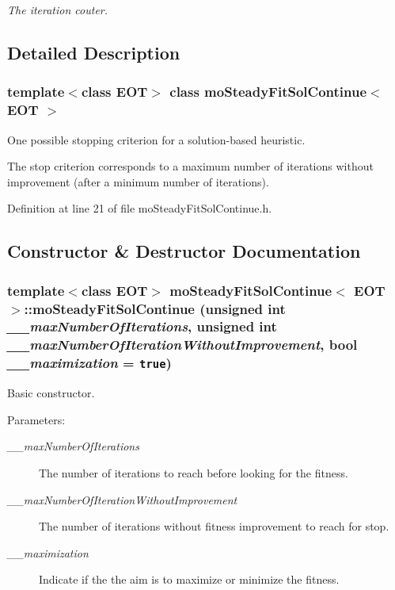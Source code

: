 \begin{CompactItemize}
\begin{CompactList}\small\item\em The iteration couter. \item\end{CompactList}\end{CompactItemize}


\subsection{Detailed Description}
\subsubsection*{template$<$class EOT$>$ class moSteadyFitSolContinue$<$ EOT $>$}

One possible stopping criterion for a solution-based heuristic. 

The stop criterion corresponds to a maximum number of iterations without improvement (after a minimum number of iterations). 



Definition at line 21 of file moSteadyFitSolContinue.h.

\subsection{Constructor \& Destructor Documentation}
\subsubsection{\setlength{\rightskip}{0pt plus 5cm}template$<$class EOT$>$ {\bf moSteadyFitSolContinue}$<$ EOT $>$::{\bf moSteadyFitSolContinue} (unsigned int {\em \_\-\_\-maxNumberOfIterations}, unsigned int {\em \_\-\_\-maxNumberOfIterationWithoutImprovement}, bool {\em \_\-\_\-maximization} = {\tt true})\hspace{0.3cm}{\tt  [inline]}}\label{classmo_steady_fit_sol_continue_3ebfa3cfb83cdbf2e23cddc9d16fd00b}


Basic constructor. 

\begin{Desc}
\item[Parameters:]
\begin{description}
\item[{\em \_\-\_\-maxNumberOfIterations}]The number of iterations to reach before looking for the fitness. \item[{\em \_\-\_\-maxNumberOfIterationWithoutImprovement}]The number of iterations without fitness improvement to reach for stop. \item[{\em \_\-\_\-maximization}]Indicate if the the aim is to maximize or minimize the fitness. \end{description}
\end{Desc}


